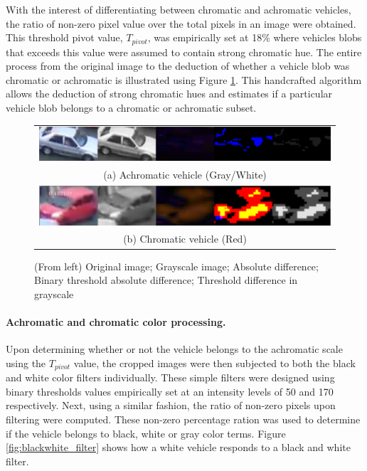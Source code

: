 With the interest of differentiating between chromatic and achromatic vehicles, the ratio of non-zero pixel value over the total pixels in an image were obtained. This threshold pivot value, $T_{pivot}$, was empirically set at 18\% where vehicles blobs that exceeds this value were assumed to contain strong chromatic hue. The entire process from the original image to the deduction of whether a vehicle blob was chromatic or achromatic is illustrated using Figure \ref{fig:achromatic_thresh}. This handcrafted algorithm allows the deduction of strong chromatic hues and estimates if a particular vehicle blob belongs to a chromatic or achromatic subset. 


\begin{figure}[htb!]
  \centering
\begin{tabular}{c}
 \includegraphics[width=0.9\linewidth]{image/general/achromatic_threshold5.PNG} \\  
 (a) Achromatic vehicle (Gray/White) \\
 \includegraphics[width=0.9\linewidth]{image/general/achromatic_threshold_color2.PNG}\\
(b) Chromatic vehicle (Red)
\end{tabular}
\caption{(From left) Original image; Grayscale image; Absolute difference; Binary threshold absolute difference; Threshold difference in grayscale} \label{fig:achromatic_thresh}
\end{figure}



\paragraph{Achromatic and chromatic color processing.} Upon determining whether or not the vehicle belongs to the achromatic scale using the $T_{pivot}$ value, the cropped images were then subjected to both the black and white color filters individually. These simple filters were designed using binary thresholds values empirically set at an intensity levels of 50 and 170 respectively. Next, using a similar fashion, the ratio of non-zero pixels upon filtering were computed. These non-zero percentage ration was used to determine if the vehicle belongs to black, white or gray color terms. Figure \ref{fig:blackwhite_filter} shows how a white vehicle responds to a black and white filter. 

